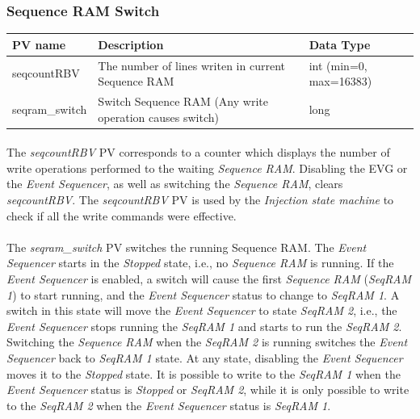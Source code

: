 \documentclass[openany]{article}
\begin{document}
		\subsubsection{Sequence RAM Switch}\label{pvgroup:evg-seqram-switch}
			\begin{center}
			\begin{tabular}{| m{2.8cm} m{6cm} m{6cm} |}
			    \hline
			    \bfseries PV name & \bfseries Description & \bfseries Data Type \\ \hline
			    seqcountRBV & The number of lines writen in current Sequence RAM & int (min=0, max=16383) \\ \hline
			    seqram\_switch & Switch Sequence RAM (Any write operation causes switch) & long \\ \hline
			\end{tabular}
			\end{center}

			\paragraph{} The \emph{seqcountRBV} PV corresponds to a counter which displays the number of write operations performed to the waiting \emph{Sequence RAM}. Disabling the EVG or the \emph{Event Sequencer}, as well as switching the \emph{Sequence RAM}, clears \emph{seqcountRBV}. The \emph{seqcountRBV} PV is used by the \emph{Injection state machine} to check if all the write commands were effective.
			\paragraph{} The \emph{seqram\_switch} PV switches the running Sequence RAM. The \emph{Event Sequencer} starts in the \emph{Stopped} state, i.e., no \emph{Sequence RAM} is running. If the \emph{Event Sequencer} is enabled, a switch will cause the first \emph{Sequence RAM} (\emph{SeqRAM 1}) to start running, and the \emph{Event Sequencer} status to change to \emph{SeqRAM 1}. A switch in this state will move the \emph{Event Sequencer} to state \emph{SeqRAM 2}, i.e., the \emph{Event Sequencer} stops running the \emph{SeqRAM 1} and starts to run the \emph{SeqRAM 2}. Switching the \emph{Sequence RAM} when the \emph{SeqRAM 2} is running switches the \emph{Event Sequencer} back to \emph{SeqRAM 1} state. At any state, disabling the \emph{Event Sequencer} moves it to the \emph{Stopped} state. It is possible to write to the \emph{SeqRAM 1} when the \emph{Event Sequencer} status is \emph{Stopped} or \emph{SeqRAM 2}, while it is only possible to write to the \emph{SeqRAM 2} when the \emph{Event Sequencer} status is \emph{SeqRAM 1}.
\end{document}
